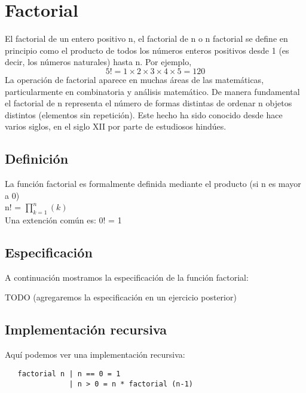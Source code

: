 \documentclass{article}
\begin{document}
\section{Factorial}

El factorial de un entero positivo n, el factorial de n o n factorial se define en principio como el producto de todos los números
enteros positivos desde 1 (es decir, los números naturales) hasta n. Por ejemplo,
\[
5! = 1 \times 2 \times 3 \times 4 \times 5 = 120 
\]
La operación de factorial aparece en muchas áreas de las matemáticas, particularmente en combinatoria y análisis matemático.
De manera fundamental el factorial de n representa el número de formas distintas de ordenar n objetos distintos (elementos sin
repetición). Este hecho ha sido conocido desde hace varios siglos, en el siglo XII por parte de estudiosos hindúes.

\subsection{Definición}
La función factorial es formalmente definida mediante el producto (si n es mayor a 0)\\

n! = $ \prod_{k=1}^{n} (k) $\\

Una extención común es:
0! = 1

\subsection{Especificación}
A continuación mostramos la especificación de la función factorial:

TODO (agregaremos la especificación en un ejercicio posterior)

\subsection{Implementación recursiva}
Aquí podemos ver una implementación recursiva:

\begin{verbatim}
   factorial n | n == 0 = 1
               | n > 0 = n * factorial (n-1)
\end{verbatim}
\end{document}
